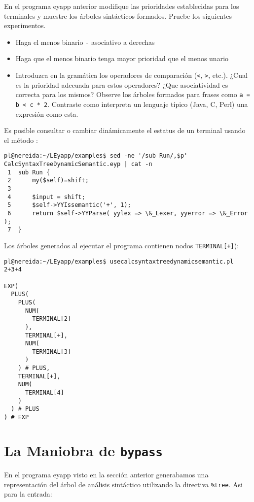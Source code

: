 \begin{exercise}
En el programa eyapp anterior modifique las prioridades establecidas para los terminales
y muestre los
árboles sintácticos formados. Pruebe los siguientes
experimentos.
\begin{itemize}
\item
Haga el menos binario \verb|-| asociativo a derechas
\item
Haga que el menos binario tenga mayor prioridad que el menos unario
\item
Introduzca en la gramática los operadores de comparación (\verb|<|, \verb|>|, etc.).
¿Cual es la prioridad adecuada para estos operadores? 
¿Que asociatividad es correcta para los mismos?
Observe los árboles formados para frases como
\verb|a = b < c * 2|. Contraste como  interpreta un lenguaje típico (Java, C, Perl)
una expresión como esta.
\end{itemize}
\end{exercise}


Es posible consultar o cambiar dinámicamente el estatus de un terminal usando el método
:

\begin{verbatim}
pl@nereida:~/LEyapp/examples$ sed -ne '/sub Run/,$p' CalcSyntaxTreeDynamicSemantic.eyp | cat -n
 1  sub Run {
 2      my($self)=shift;
 3
 4      $input = shift;
 5      $self->YYIssemantic('+', 1);
 6      return $self->YYParse( yylex => \&_Lexer, yyerror => \&_Error );
 7  }
\end{verbatim}

Los árboles generados al ejecutar el programa 
contienen nodos \verb|TERMINAL[+]|):

\begin{verbatim}
pl@nereida:~/LEyapp/examples$ usecalcsyntaxtreedynamicsemantic.pl
2+3+4

EXP(
  PLUS(
    PLUS(
      NUM(
        TERMINAL[2]
      ),
      TERMINAL[+],
      NUM(
        TERMINAL[3]
      )
    ) # PLUS,
    TERMINAL[+],
    NUM(
      TERMINAL[4]
    )
  ) # PLUS
) # EXP
\end{verbatim}

\section{La Maniobra de {\tt bypass}}
\label{section:maniobradebypass}

En el programa eyapp visto en la sección anterior generabamos una representación 
del árbol de análisis sintáctico utilizando la directiva \verb|%tree|. Asi para la entrada:


